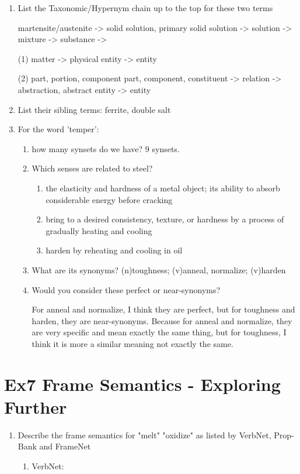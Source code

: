 \documentclass[12pt]{article}
\begin{document}
{\begin{enumerate}[1.]
	martensite: a solid solution of carbon in alpha-iron that is formed when steel is cooled so rapidly that 
	the change from austenite to pearlite is suppressed; responsible for the hardness of quenched steel.

	austenite: a solid solution of ferric carbide or carbon in iron; cools to form pearlite or martensite.
	\item List the Taxonomic/Hypernym chain up to the top for these two terms
	
	martensite/austenite -> solid solution, primary solid solution -> solution -> mixture -> substance ->

	(1) matter -> physical entity -> entity

	(2) part, portion, component part, component, constituent -> relation -> abstraction, abstract entity -> entity

	\item List their sibling terms: 
	ferrite, double salt
	\item For the word 'temper': 
	\begin{enumerate}[(1)]
		\item how many synsets do we have? 9 synsets. 
		\item Which senses are related to steel? 
			\begin{enumerate}[1*]
				\item the elasticity and hardness of a metal object; 
				its ability to absorb considerable energy before cracking
				\item bring to a desired consistency, texture, or hardness by a process of gradually heating and cooling
				\item harden by reheating and cooling in oil
			\end{enumerate}
		\item What are its synonyms? (n)toughness; (v)anneal, normalize; (v)harden
		\item Would you consider these perfect or near-synonyms? 
		
		For anneal and normalize, I think they are perfect, but for toughness and harden, they are near-synonyms. 
		Because for anneal and normalize, they are very specific and mean exactly the same thing, but for toughness, 
		I think it is more a similar meaning not exactly the same.
	\end{enumerate}
\end{enumerate}

\newpage
\section{Ex7 Frame Semantics - Exploring Further}
\label{sec: ex7}
\begin{enumerate}[1.]
	\item Describe the frame semantics for "melt" "oxidize" as listed by VerbNet, Prop-Bank and FrameNet
	\begin{enumerate}[(1)]
		\item VerbNet:
		

\end{enumerate}
\end{enumerate}}
\end{document}
